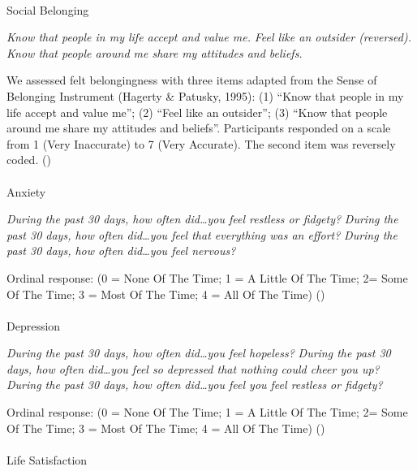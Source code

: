 \documentclass[
  single column]{article}
\makeatletter
\let\oldparagraph\paragraph
\renewcommand{\paragraph}{
    \@ifstar
      \xxxParagraphStar
      \xxxParagraphNoStar
  }
\newcommand{\xxxParagraphStar}[1]{\oldparagraph*{#1}\mbox{}}
\newcommand{\xxxParagraphNoStar}[1]{\oldparagraph{#1}\mbox{}}
\makeatother
\begin{document}
\paragraph{Social Belonging}\label{social-belonging-1}

\emph{Know that people in my life accept and value me.} \emph{Feel like
an outsider (reversed).} \emph{Know that people around me share my
attitudes and beliefs.}

We assessed felt belongingness with three items adapted from the Sense
of Belonging Instrument (Hagerty \& Patusky, 1995): (1) ``Know that
people in my life accept and value me''; (2) ``Feel like an outsider'';
(3) ``Know that people around me share my attitudes and beliefs''.
Participants responded on a scale from 1 (Very Inaccurate) to 7 (Very
Accurate). The second item was reversely coded.
()

\paragraph{Anxiety}\label{anxiety}

\emph{During the past 30 days, how often did\ldots you feel restless or
fidgety?} \emph{During the past 30 days, how often did\ldots you feel
that everything was an effort?} \emph{During the past 30 days, how often
did\ldots you feel nervous?}

Ordinal response: (0 = None Of The Time; 1 = A Little Of The Time; 2=
Some Of The Time; 3 = Most Of The Time; 4 = All Of The Time)
()

\paragraph{Depression}\label{depression}

\emph{During the past 30 days, how often did\ldots you feel hopeless?}
\emph{During the past 30 days, how often did\ldots you feel so depressed
that nothing could cheer you up?} \emph{During the past 30 days, how
often did\ldots you feel you feel restless or fidgety?}

Ordinal response: (0 = None Of The Time; 1 = A Little Of The Time; 2=
Some Of The Time; 3 = Most Of The Time; 4 = All Of The Time)
()

\paragraph{Life Satisfaction}\label{life-satisfaction}
\end{document}
